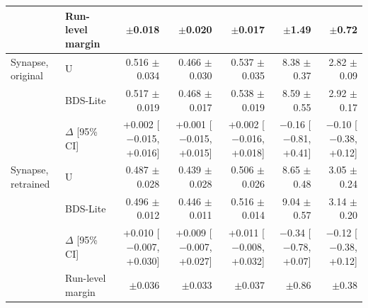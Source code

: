\begin{tabular}{llrrrrr}
\addlinespace
 & Run-level margin & $\pm$0.018 & $\pm$0.020 & $\pm$0.017 & $\pm$1.49 & $\pm$0.72 \\
\midrule
Synapse, original & U & 0.516 $\pm$ 0.034 & 0.466 $\pm$ 0.030 & 0.537 $\pm$ 0.035 & 8.38 $\pm$ 0.37 & 2.82 $\pm$ 0.09 \\
 & BDS-Lite & 0.517 $\pm$ 0.019 & 0.468 $\pm$ 0.017 & 0.538 $\pm$ 0.019 & 8.59 $\pm$ 0.55 & 2.92 $\pm$ 0.17 \\
 & $\Delta$ [95\% CI] & +0.002 [$-$0.015, +0.016] & +0.001 [$-$0.015, +0.015] & +0.002 [$-$0.016, +0.018] & $-$0.16 [$-$0.81, +0.41] & $-$0.10 [$-$0.38, +0.12] \\
\addlinespace
Synapse, retrained & U & 0.487 $\pm$ 0.028 & 0.439 $\pm$ 0.028 & 0.506 $\pm$ 0.026 & 8.65 $\pm$ 0.48 & 3.05 $\pm$ 0.24 \\
 & BDS-Lite & 0.496 $\pm$ 0.012 & 0.446 $\pm$ 0.011 & 0.516 $\pm$ 0.014 & 9.04 $\pm$ 0.57 & 3.14 $\pm$ 0.20 \\
 & $\Delta$ [95\% CI] & +0.010 [$-$0.007, +0.030] & +0.009 [$-$0.007, +0.027] & +0.011 [$-$0.008, +0.032] & $-$0.34 [$-$0.78, +0.07] & $-$0.12 [$-$0.38, +0.12] \\
\addlinespace
 & Run-level margin & $\pm$0.036 & $\pm$0.033 & $\pm$0.037 & $\pm$0.86 & $\pm$0.38 \\
\bottomrule
\end{tabular}
